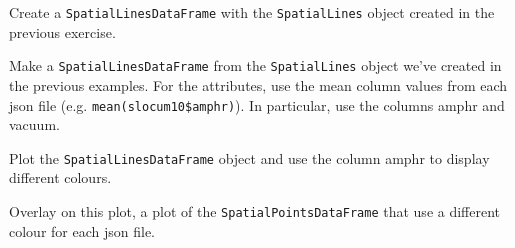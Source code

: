 \documentclass[11pt, oneside]{article}   	%
\begin{document}
\begin{Exercise}
Create a \texttt{SpatialLinesDataFrame} with the \texttt{SpatialLines} object created in the previous exercise.

\Question Make a \texttt{SpatialLinesDataFrame} from the \texttt{SpatialLines} object we've created in the previous examples. For the attributes, use the mean column values from each json file (e.g. \texttt{mean(slocum10\$amphr)}). In particular, use the  columns amphr and vacuum.

\Question Plot the \texttt{SpatialLinesDataFrame} object and use the column amphr to display different colours.



\Question Overlay on this plot, a plot of the \texttt{SpatialPointsDataFrame} that use a different colour for each json file.

\end{Exercise}
\end{document}
